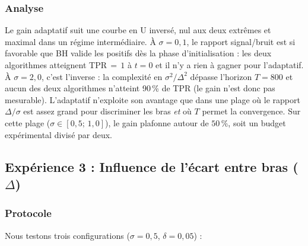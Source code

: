 \documentclass[10.5pt,a4paper]{article}
\begin{document}
\subsubsection{Analyse}

Le gain adaptatif suit une courbe en U inversé, nul aux deux extrêmes et maximal dans un régime intermédiaire. À $\sigma=0{,}1$, le rapport signal/bruit est si favorable que BH valide les positifs dès la phase d'initialisation : les deux algorithmes atteignent TPR$\,=\,1$ à $t=0$ et il n'y a rien à gagner pour l'adaptatif. À $\sigma=2{,}0$, c'est l'inverse : la complexité en $\sigma^2/\Delta^2$ dépasse l'horizon $T=800$ et aucun des deux algorithmes n'atteint 90\,\% de TPR (le gain n'est donc pas
mesurable). L'adaptatif n'exploite son avantage que dans une plage où
le rapport $\Delta/\sigma$ est assez grand pour discriminer les bras
\emph{et} où $T$ permet la convergence. Sur cette plage ($\sigma\in[0{,}5;\,1{,}0]$), le gain plafonne autour de $50\,\%$, soit un budget expérimental divisé par deux.

\subsection{Expérience 3 : Influence de l'écart entre bras ($\Delta$)}

\subsubsection{Protocole}

Nous testons trois configurations ($\sigma = 0{,}5$, $\delta = 0{,}05$) :
\end{document}
